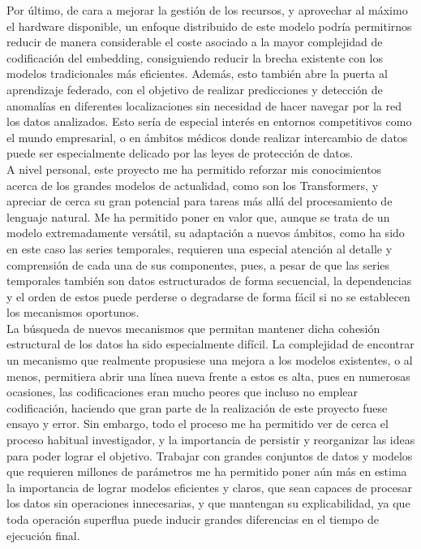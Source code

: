 Por último, de cara a mejorar la gestión de los recursos, y aprovechar al máximo el hardware disponible, un enfoque distribuido de este modelo podría permitirnos reducir de manera considerable el coste asociado a la mayor complejidad de codificación del embedding, consiguiendo reducir la brecha existente con los modelos tradicionales más eficientes. Además, esto también abre la puerta al aprendizaje federado, con el objetivo de realizar predicciones y detección de anomalías en diferentes localizaciones sin necesidad de hacer navegar por la red los datos analizados. Esto sería de especial interés en entornos competitivos como el mundo empresarial, o en ámbitos médicos donde realizar intercambio de datos puede ser especialmente delicado por las leyes de protección de datos.\\

A nivel personal, este proyecto me ha permitido reforzar mis conocimientos acerca de los grandes modelos de actualidad, como son los Transformers, y apreciar de cerca su gran potencial para tareas más allá del procesamiento de lenguaje natural. Me ha permitido poner en valor que, aunque se trata de un modelo extremadamente versátil, su adaptación a nuevos ámbitos, como ha sido en este caso las series temporales, requieren una especial atención al detalle y comprensión de cada una de sus componentes, pues, a pesar de que las series temporales también son datos estructurados de forma secuencial, la dependencias y el orden de estos puede perderse o degradarse de forma fácil si no se establecen los mecanismos oportunos.\\

La búsqueda de nuevos mecanismos que permitan mantener dicha cohesión estructural de los datos ha sido especialmente difícil. La complejidad de encontrar un mecanismo que realmente propusiese una mejora a los modelos existentes, o al menos, permitiera abrir una línea nueva frente a estos es alta, pues en numerosas ocasiones, las codificaciones eran mucho peores que incluso no emplear codificación, haciendo que gran parte de la realización de este proyecto fuese ensayo y error. Sin embargo, todo el proceso me ha permitido ver de cerca el proceso habitual investigador, y la importancia de persistir y reorganizar las ideas para poder lograr el objetivo. Trabajar con grandes conjuntos de datos y modelos que requieren millones de parámetros me ha permitido poner aún más en estima la importancia de lograr modelos eficientes y claros, que sean capaces de procesar los datos sin operaciones innecesarias, y que mantengan su explicabilidad, ya que toda operación superflua puede inducir grandes diferencias en el tiempo de ejecución final.